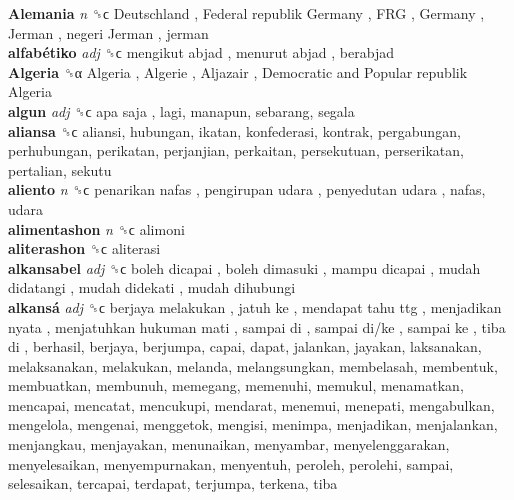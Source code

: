 \textbf{Alemania} \emph{n}  ␝ϲ   Deutschland ,  Federal republik Germany ,  FRG ,  Germany ,  Jerman ,  negeri Jerman , jerman  \\
\textbf{alfabétiko} \emph{adj}  ␝ϲ   mengikut abjad ,  menurut abjad , berabjad  \\
\textbf{Algeria} ␝α   Algeria ,  Algerie ,  Aljazair ,  Democratic and Popular republik Algeria   \\
\textbf{algun} \emph{adj}  ␝ϲ   apa saja , lagi, manapun, sebarang, segala  \\
\textbf{aliansa} ␝ϲ  aliansi, hubungan, ikatan, konfederasi, kontrak, pergabungan, perhubungan, perikatan, perjanjian, perkaitan, persekutuan, perserikatan, pertalian, sekutu  \\
\textbf{aliento} \emph{n}  ␝ϲ   penarikan nafas ,  pengirupan udara ,  penyedutan udara , nafas, udara  \\
\textbf{alimentashon} \emph{n}  ␝ϲ  alimoni  \\
\textbf{aliterashon} ␝ϲ  aliterasi  \\
\textbf{alkansabel} \emph{adj}  ␝ϲ   boleh dicapai ,  boleh dimasuki ,  mampu dicapai ,  mudah didatangi ,  mudah didekati ,  mudah dihubungi   \\
\textbf{alkansá} \emph{adj}  ␝ϲ   berjaya melakukan ,  jatuh ke ,  mendapat tahu ttg ,  menjadikan nyata ,  menjatuhkan hukuman mati ,  sampai di ,  sampai di/ke ,  sampai ke ,  tiba di , berhasil, berjaya, berjumpa, capai, dapat, jalankan, jayakan, laksanakan, melaksanakan, melakukan, melanda, melangsungkan, membelasah, membentuk, membuatkan, membunuh, memegang, memenuhi, memukul, menamatkan, mencapai, mencatat, mencukupi, mendarat, menemui, menepati, mengabulkan, mengelola, mengenai, menggetok, mengisi, menimpa, menjadikan, menjalankan, menjangkau, menjayakan, menunaikan, menyambar, menyelenggarakan, menyelesaikan, menyempurnakan, menyentuh, peroleh, perolehi, sampai, selesaikan, tercapai, terdapat, terjumpa, terkena, tiba  \\
